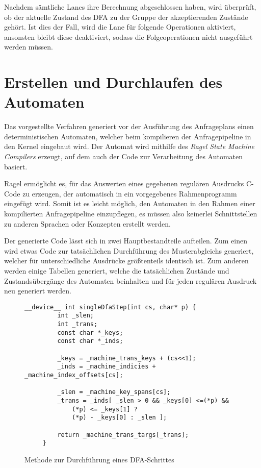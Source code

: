 Nachdem sämtliche Lanes ihre Berechnung abgeschlossen haben, wird überprüft, ob der aktuelle Zustand des DFA zu der Gruppe der akzeptierenden Zustände gehört.
Ist dies der Fall, wird die Lane für folgende Operationen aktiviert, ansonsten bleibt diese deaktiviert, sodass die Folgeoperationen nicht ausgeführt werden müssen.

\section{Erstellen und Durchlaufen des Automaten}
\label{sec:regex_duchlaufen}

Das vorgestellte Verfahren generiert vor der Ausführung des Anfrageplans einen deterministischen Automaten, welcher beim kompilieren der Anfragepipeline in den Kernel eingebaut wird.
Der Automat wird mithilfe des \emph{Ragel State Machine Compilers} \cite{Thurston2009} erzeugt, auf dem auch der Code zur Verarbeitung des Automaten basiert.

Ragel ermöglicht es, für das Auswerten eines gegebenen regulären Ausdrucks C-Code zu erzeugen, der automatisch in ein vorgegebenes Rahmenprogramm eingefügt wird.
Somit ist es leicht möglich, den Automaten in den Rahmen einer kompilierten Anfragepipeline einzupflegen, es müssen also keinerlei Schnittstellen zu anderen Sprachen oder Konzepten erstellt werden.

Der generierte Code lässt sich in zwei Hauptbestandteile aufteilen.
Zum einen wird etwas Code zur tatsächlichen Durchführung des Musterabgleichs generiert, welcher für unterschiedliche Ausdrücke größtenteils identisch ist.
Zum anderen werden einige Tabellen generiert, welche die tatsächlichen Zustände und Zustandsübergänge des Automaten beinhalten und für jeden regulären Ausdruck neu generiert werden.

\begin{figure}[ht]
	 \begin{lstlisting}[language=MyC++]
	 __device__ int singleDfaStep(int cs, char* p) {
		 int _slen;
		 int _trans;
		 const char *_keys;
		 const char *_inds;
		 
		 _keys = _machine_trans_keys + (cs<<1);
		 _inds = _machine_indicies + _machine_index_offsets[cs];
		 
		 _slen = _machine_key_spans[cs];
		 _trans = _inds[ _slen > 0 && _keys[0] <=(*p) &&
			 (*p) <= _keys[1] ?
			 (*p) - _keys[0] : _slen ];
		 
		 return _machine_trans_targs[_trans];
	 }
	 \end{lstlisting}
	 \caption{Methode zur Durchführung eines DFA-Schrittes}
	 \label{naive_regex_singledfastep}
\end{figure}
 
